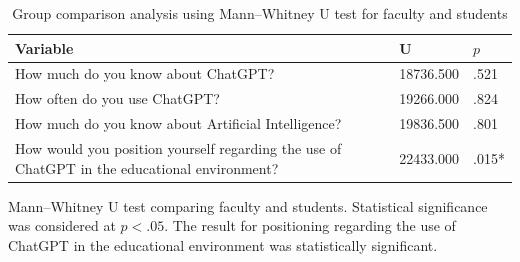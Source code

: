 \documentclass[english]{textolivre}
\begin{document}
\vspace{1cm}

\begin{table}[h]
\centering
\small
\begin{threeparttable}
\caption{Group comparison analysis using Mann--Whitney U test for faculty and students}
\label{tab:group_comparison}
\begin{tabular}{p{6cm} p{3cm} p{3cm}}
\toprule
Variable & U & $p$ \\
\midrule

How much do you know about ChatGPT?
& 18736.500
& .521 \\

How often do you use ChatGPT?
& 19266.000
& .824 \\

How much do you know about Artificial Intelligence?
& 19836.500
& .801 \\

How would you position yourself regarding the use of ChatGPT in the educational environment?
& 22433.000
& .015* \\

\bottomrule
\end{tabular}
\begin{tablenotes}
\item Mann--Whitney U test comparing faculty and students. Statistical significance was considered at $p < .05$. The result for positioning regarding the use of ChatGPT in the educational environment was statistically significant.
\end{tablenotes}
\end{threeparttable}
\end{table}

\vfill
\end{document}
